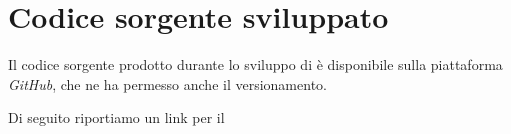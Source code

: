 \chapter{Codice sorgente sviluppato}
  Il codice sorgente prodotto durante lo sviluppo di  è disponibile sulla piattaforma \emph{GitHub}, che ne ha permesso anche il versionamento.

  \begin{center} Di seguito riportiamo un link per il \href{https://github.com/luftmensch-luftmensch/InfoPoint/}{}\footnotemark {} \end{center}
